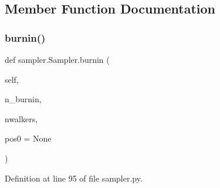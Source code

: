 \subsection{Member Function Documentation}
\mbox{\label{classsampler_1_1Sampler_a0520c9a624d5abc9edd3e379d1b66021}} 
\subsubsection{\texorpdfstring{burnin()}{burnin()}}
{\footnotesize\ttfamily def sampler.\+Sampler.\+burnin (\begin{DoxyParamCaption}\item[{}]{self,  }\item[{}]{n\+\_\+burnin,  }\item[{}]{nwalkers,  }\item[{}]{pos0 = {\ttfamily None} }\end{DoxyParamCaption})}



Definition at line 95 of file sampler.\+py.



